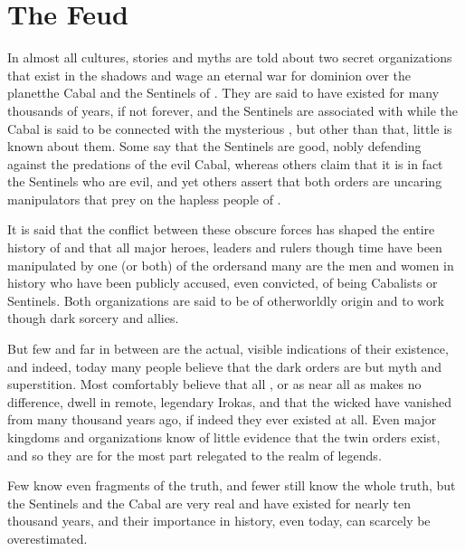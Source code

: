 
\chapter{The Feud}
In almost all \Miithian{} cultures, stories and myths are told about two secret organizations that exist in the shadows and wage an eternal war for dominion over the planet\dash{}the Cabal and the Sentinels of \Miith{}. They are said to have existed for many thousands of years, if not forever, and the Sentinels are associated with \dragons{} while the Cabal is said to be connected with the mysterious \banes{}, but other than that, little is known about them. Some say that the Sentinels are good, nobly defending \Miith{} against the predations of the evil Cabal, whereas others claim that it is in fact the Sentinels who are evil, and yet others assert that both orders are uncaring manipulators that prey on the hapless people of \Miith{}. 

It is said that the conflict between these obscure forces has shaped the entire history of \Miith{} and that all major heroes, leaders and rulers though time have been manipulated by one (or both) of the orders\dash{}and many are the men and women in history who have been publicly accused, even convicted, of being Cabalists or Sentinels. Both organizations are said to be of otherworldly origin and to work though dark sorcery and \daemonic{} allies. 

But few and far in between are the actual, visible indications of their existence, and indeed, today many people believe that the dark orders are but myth and superstition. Most \Velcadians{} comfortably believe that all \dragons{}, or as near all as makes no difference, dwell in remote, legendary Irokas, and that the wicked \banes{} have vanished from \Miith{} many thousand years ago, if indeed they ever existed at all. Even major kingdoms and organizations know of little evidence that the twin orders exist, and so they are for the most part relegated to the realm of legends. 

Few know even fragments of the truth, and fewer still know the whole truth, but the Sentinels and the Cabal are very real and have existed for nearly ten thousand years, and their importance in \Miithian{} history, even today, can scarcely be overestimated. 















